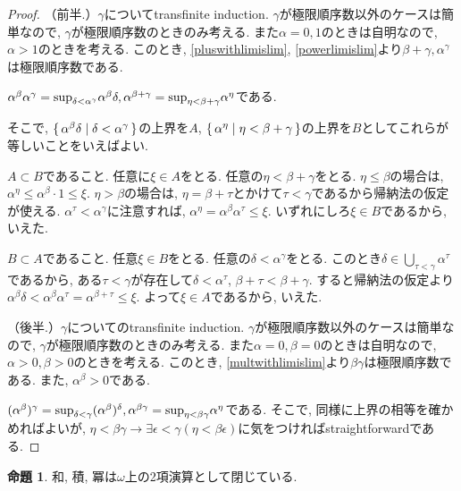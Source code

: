 \documentclass[a4paper, twoside]{bxjsarticle}
\theoremstyle{definition}
\newtheorem{prop}[thm]{命題}
\begin{document}
        \begin{proof}
            （前半.）$\gamma$についてtransfinite induction. $\gamma$が極限順序数以外のケースは簡単なので, $\gamma$が極限順序数のときのみ考える. また$\alpha=0, 1$のときは自明なので, $\alpha>1$のときを考える. このとき, \ref{pluswithlimislim}, \ref{powerlimislim}より$\beta+\gamma, \alpha^\gamma$は極限順序数である.
            
            $\alpha^\beta\alpha^\gamma = {\rm sup}_{\delta<\alpha^\gamma}\alpha^\beta\delta, \alpha^{\beta+\gamma}={\rm sup}_{\eta<\beta+\gamma}\alpha^\eta$である.
            
            そこで, $\set{\alpha^\beta\delta|\delta<\alpha^\gamma}$の上界を$A$, $\set{\alpha^\eta|\eta<\beta+\gamma}$の上界を$B$としてこれらが等しいことをいえばよい.
            
            $A\subset B$であること. 任意に$\xi\in A$をとる. 任意の$\eta<\beta+\gamma$をとる. $\eta\leq\beta$の場合は, $\alpha^\eta\leq\alpha^\beta\cdot1\leq\xi$. $\eta>\beta$の場合は, $\eta=\beta+\tau$とかけて$\tau<\gamma$であるから帰納法の仮定が使える. $\alpha^\tau<\alpha^\gamma$に注意すれば, $\alpha^\eta=\alpha^\beta\alpha^\tau\leq\xi$. いずれにしろ$\xi\in B$であるから, いえた.
            
            $B\subset A$であること. 任意$\xi\in B$をとる. 任意の$\delta<\alpha^\gamma$をとる. このとき$\delta\in\bigcup_{\tau<\gamma}\alpha^\tau$であるから, ある$\tau<\gamma$が存在して$\delta<\alpha^\tau$, $\beta+\tau<\beta+\gamma$. すると帰納法の仮定より$\alpha^\beta\delta<\alpha^\beta\alpha^\tau=\alpha^{\beta+\tau}\leq\xi$. よって$\xi\in A$であるから, いえた.
            
            （後半.）$\gamma$についてのtransfinite induction. $\gamma$が極限順序数以外のケースは簡単なので, $\gamma$が極限順序数のときのみ考える. また$\alpha=0, \beta=0$のときは自明なので, $\alpha>0, \beta>0$のときを考える. このとき, \ref{multwithlimislim}より$\beta\gamma$は極限順序数である. また, $\alpha^\beta>0$である.
            
            $(\alpha^\beta)^\gamma = {\rm sup}_{\delta<\gamma}(\alpha^\beta)^\delta, \alpha^{\beta\gamma}={\rm sup}_{\eta<\beta\gamma}\alpha^\eta$である. そこで, 同様に上界の相等を確かめればよいが, $\eta<\beta\gamma\to\exists\epsilon<\gamma(\eta<\beta\epsilon)$に気をつければstraightforwardである.
        \end{proof}
        \begin{prop}
            和, 積, 冪は$\omega$上の2項演算として閉じている.
        \end{prop}
\end{document}

